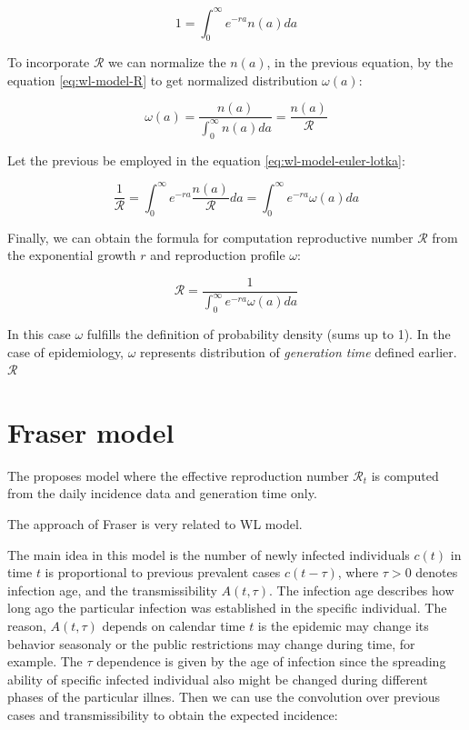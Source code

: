 \documentclass[
  digital, %
  oneside, %
  lof,     %
  lot,     %
]{fithesis4}
\begin{document}
\begin{equation}\label{eq:wl-model-euler-lotka}
  1 = \int_{0}^{\infty} e^{-ra} n(a) da
\end{equation}

To incorporate $\mathcal{R}$ we can normalize the $n(a)$, in the
previous equation, by the equation \eqref{eq:wl-model-R} to get
normalized distribution $\omega(a)$:

\begin{equation}
  \omega(a) = \frac{n(a)}{\int_0^{\infty} n(a) da} = \frac{n(a)}{\mathcal{R}}
\end{equation}

Let the previous be employed in the equation \eqref{eq:wl-model-euler-lotka}:

\begin{equation}\label{eq:wl-model-euler-lotka-R}
  \frac{1}{\mathcal{R}} = \int_{0}^{\infty} e^{-ra} \frac{n(a)}{\mathcal{R}} da = \int_{0}^{\infty} e^{-ra} \omega(a) da
\end{equation}

Finally, we can obtain the formula for computation reproductive number
$\mathcal{R}$ from the exponential growth $r$ and reproduction profile $\omega$:

\begin{equation}\label{eq:wl-model-euler-lotka-R-final}
  \mathcal{R} = \frac{1}{\int_{0}^{\infty} e^{-ra} \omega(a) da}
\end{equation}

In this case $\omega$ fulfills the definition of probability density
(sums up to 1). In the case of epidemiology, $\omega$ represents
distribution of \textit{generation time} defined earlier.
$\mathcal{R}$

\section{Fraser model}

The \cite{fraser2007} proposes model where the effective 
reproduction number $\mathcal{R}_t$ is computed from the 
daily incidence data and generation time only.

The approach of Fraser is very related to WL
model.


The main idea in this model is the number of newly infected 
individuals $c(t)$ in time $t$ is proportional to 
previous prevalent cases $c(t - \tau)$, where 
$\tau > 0$ denotes infection age, and the transmissibility 
$A(t, \tau)$. The infection age describes how long ago 
the particular infection was established in the specific 
individual.
The reason, $A(t, \tau)$ depends on calendar time $t$ is 
the epidemic may change its behavior seasonaly or the 
public restrictions may change during time, for example.
The $\tau$ dependence is given by the age of infection 
since the spreading ability of specific infected individual 
also might be changed during different phases of the 
particular illnes.
Then we can use the convolution over previous cases 
and transmissibility to obtain the expected incidence:
\end{document}
